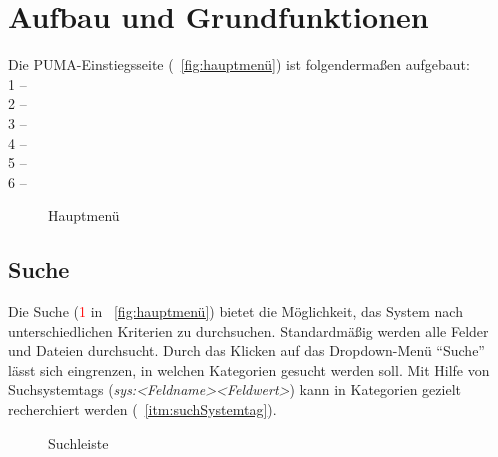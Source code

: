 \chapter{Aufbau und Grundfunktionen}

Die PUMA-Einstiegsseite (~\autoref{fig:hauptmenü}) ist folgendermaßen aufgebaut:\\
1 -- \\ 
2 -- \\
3 -- \\
4 -- \\
5 -- \\
6 -- \\ 

\begin{figure}[htb]
 \centering
 \caption{Hauptmenü}
 \label{fig:hauptmenü}
\end{figure} 

\section{Suche}
\label{sec:suche}
Die Suche (\textcolor{red}{1} in ~\autoref{fig:hauptmenü}) bietet die Möglichkeit, das System nach unterschiedlichen Kriterien zu durchsuchen. Standardmäßig werden alle Felder und Dateien durchsucht. Durch das Klicken auf das Dropdown-Menü \enquote{Suche} lässt sich eingrenzen, in welchen Kategorien gesucht werden soll. Mit Hilfe von Suchsystemtags (\textit{sys:<Feldname><Feldwert>}) kann in Kategorien gezielt recherchiert werden (~\autoref{itm:suchSystemtag}).
 
\begin{figure}[h!]
 \centering
 \caption{Suchleiste}
 \label{fig:suchleiste}
\end{figure} 

